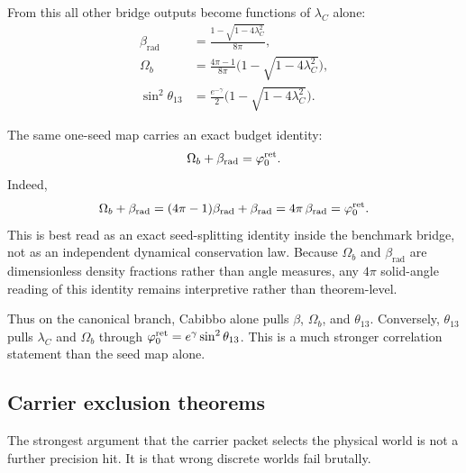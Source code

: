 From this all other bridge outputs become functions of $\lambda_C$ alone:
\begin{equation}
\label{eq:lambda-c-master}
\begin{aligned}
\beta_{\mathrm{rad}}&=\frac{1-\sqrt{1-4\lambda_C^2}}{8\pi},\\
\Omega_b&=\frac{4\pi-1}{8\pi}\bigl(1-\sqrt{1-4\lambda_C^2}\bigr),\\
\sin^2\theta_{13}&=\frac{e^{-\gamma}}{2}\bigl(1-\sqrt{1-4\lambda_C^2}\bigr).
\end{aligned}
\end{equation}
\begin{remark}
The same one-seed map carries an exact budget identity:
\begin{equation}
\label{eq:seed-budget-identity}
\Omega_b+\beta_{\mathrm{rad}}=\varphi_0^{\mathrm{ret}}.
\end{equation}
Indeed,
\[
\Omega_b+\beta_{\mathrm{rad}}
=(4\pi-1)\beta_{\mathrm{rad}}+\beta_{\mathrm{rad}}
=4\pi\,\beta_{\mathrm{rad}}
=\varphi_0^{\mathrm{ret}}.
\]
This is best read as an exact seed-splitting identity inside the benchmark bridge, not as an independent dynamical conservation law.
Because $\Omega_b$ and $\beta_{\mathrm{rad}}$ are dimensionless density fractions rather than angle measures, any $4\pi$ solid-angle reading of this identity remains interpretive rather than theorem-level.
\end{remark}

Thus on the canonical branch, Cabibbo alone pulls $\beta$, $\Omega_b$, and $\theta_{13}$. Conversely, $\theta_{13}$ pulls $\lambda_C$ and $\Omega_b$ through $\varphi_0^{\mathrm{ret}}=e^\gamma\sin^2\theta_{13}$. This is a much stronger correlation statement than the seed map alone.

\subsection{Carrier exclusion theorems}

The strongest argument that the carrier packet selects the physical world is not a further precision hit. It is that wrong discrete worlds fail brutally.

